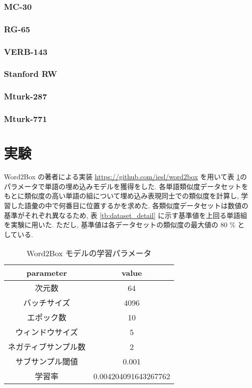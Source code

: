 \documentclass[twocolumn]{jarticle}     %
\begin{document}
\subsubsection{MC-30}
\subsubsection{RG-65}
\subsubsection{VERB-143}
\subsubsection{Stanford RW}
\subsubsection{Mturk-287}
\subsubsection{Mturk-771}

\section{実験}
Word2Box の著者による実装 \url{https://github.com/iesl/word2box} を用いて表 \ref{tb:model_parameter}のパラメータで単語の埋め込みモデルを獲得をした. 
各単語類似度データセットをもとに類似度の高い単語の組について埋め込み表現同士での類似度を計算し, 学習した語彙の中で何番目に位置するかを求めた. 
各類似度データセットは数値の基準がそれぞれ異なるため, 表 \ref{tb:dataset_detail} に示す基準値を上回る単語組を実験に用いた. 
ただし, 基準値は各データセットの類似度の最大値の 80 \% としている. 

\begin{table}[t]
  \centering
  \caption{Word2Box モデルの学習パラメータ}
  \label{tb:model_parameter}
  \begin{tabular}{|c|c|} \hline
      parameter&value \\ \hline
      次元数&64 \\
      バッチサイズ&4096 \\ 
      エポック数&10 \\
      ウィンドウサイズ&5 \\
      ネガティブサンプル数&2 \\
      サブサンプル閾値&0.001 \\
      学習率&0.004204091643267762 \\
      \hline
  \end{tabular}
\end{table}
\end{document}
